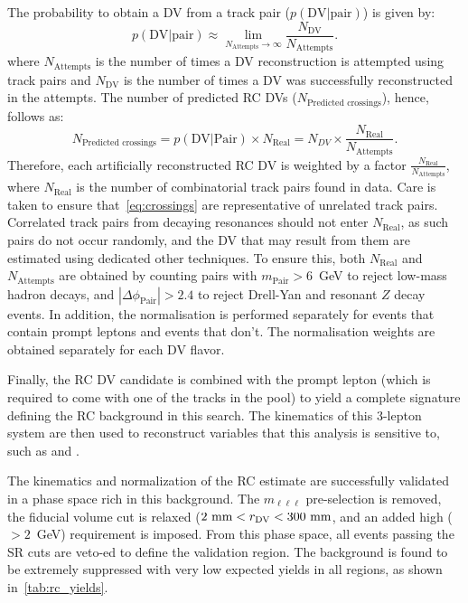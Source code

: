 The probability to obtain a DV from a track pair ($p(\text{DV|pair})$) is given by:
\begin{equation}
    p(\text{DV|pair}) \approx \lim_{N_\text{Attempts}\to \infty}\frac{N_\text{DV}}{N_\text{Attempts}}.
\end{equation}
where $N_\text{Attempts}$ is the number of times a DV reconstruction is attempted using track pairs and $N_\text{DV}$ is the number of times a DV was successfully reconstructed in the attempts. The number of predicted RC DVs ($N_\text{Predicted crossings}$), hence, follows as:
\begin{equation}\label{eq:crossings}
    N_\text{Predicted crossings} = p(\text{DV}|\text{Pair}) \times N_\text{Real} = N_{DV} \times \frac{N_\text{Real}}{N_\text{Attempts}}.
\end{equation}
Therefore, each artificially reconstructed RC DV is weighted by a factor $\frac{N_\text{Real}}{N_\text{Attempts}}$, where $N_\text{Real}$ is the number of combinatorial track pairs found in data. Care is taken to ensure that~\cref{eq:crossings} are representative of unrelated track pairs. Correlated track pairs from decaying resonances should not enter $N_\mathrm{Real}$, as such pairs do not occur randomly, and the DV that may result from them are estimated using dedicated other techniques. To ensure this, both $N_\mathrm{Real}$ and $N_\mathrm{Attempts}$ are obtained by counting pairs with $m_\mathrm{Pair}>6$~GeV to reject low-mass hadron decays, and $|\Delta\phi_\mathrm{Pair}|>2.4$ to reject Drell-Yan and resonant $Z$ decay events. In addition, the normalisation is performed separately for events that contain prompt leptons and events that don’t. The normalisation weights are obtained separately for each DV flavor.

Finally, the RC DV candidate is combined with the prompt lepton (which is required to come with one of the tracks in the pool) to yield a complete signature defining the RC background in this search. The kinematics of this 3-lepton system are then used to reconstruct variables that this analysis is sensitive to, such as \mdv and \mhnl.

The kinematics and normalization of the RC estimate are successfully validated in a phase space rich in this background. The $m_{\ell\ell\ell}$ pre-selection is removed, the fiducial volume cut is relaxed ($2\text{ mm}<r_{\mathrm{DV}}<300\text{ mm}$, and an added high \mdv ($>2$~GeV) requirement is imposed. From this phase space, all events passing the SR cuts are veto-ed to define the validation region. The background is found to be extremely suppressed with very low expected yields in all regions, as shown in~\cref{tab:rc_yields}. 

